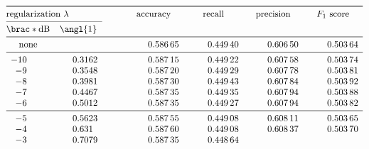 \documentclass[11pt]{report}
\DeclarePairedDelimiter\brac[]%
\DeclarePairedDelimiter\angl<>%
\begin{document}
\begin{table}[]
    \centering
    \[
        \begin{array}{@{}SS[round-mode=figures,round-precision=4]l*4{S[round-mode=figures,round-precision=5,group-separator={\,}]}}
        \toprule
            \multicolumn{2}{@{}l}{\text{regularization \(\lambda\)}}
            & \phantom{abc}
            & \text{accuracy}
            & \text{recall}
            & \text{precision}
            & \text{\(F_1\) score}
        \\*
        \cmidrule{1-2}
            \brac*{\si{\deci\bel}}
            &
            \angl{1}
        \\*
        \midrule
            \text{none} &
                && 0.58665
                & 0.4493992231017458
                & 0.6065020921872838
                & 0.5036355376125148
        \\*
        \midrule
            -10 & 0.31622776601683794
                && 0.58715
                & 0.44922446696412854
                & 0.6075849506159723
                & 0.5037411510816644
        \\*
            -9 & 0.35481338923357547
                && 0.5872
                & 0.4492886435781704
                & 0.6077762406861051
                & 0.5038066425016782
        \\*
            -8 & 0.3981071705534972
                && 0.5873
                & 0.4494337852962524
                & 0.607844995207374
                & 0.5039229368765102
        \\*
            -7 & 0.44668359215096315
                && 0.58735
                & 0.4493528201922122
                & 0.6079392009526936
                & 0.5038767122931914
        \\*
            -6 & 0.5011872336272722
                && 0.58735
                & 0.449271855088172
                & 0.6079398509472012
                & 0.5038157451076203
        \\*
        \midrule
            -5 & 0.5623413251903491
                && 0.58755
                & 0.4490842730210176
                & 0.6081144087457719
                & 0.5036484574642933
        \\*
            -4 & 0.6309573444801932
                && 0.5876
                & 0.4490842730210176
                & 0.6083680618451495
                & 0.503697137969315
        \\*
            -3 & 0.7079457843841379
                && 0.58735
                & 0.4486370071517444

\end{array}\]
\end{table}
\end{document}
